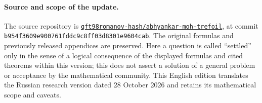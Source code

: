 \documentclass[11pt,a4paper]{article}
\theoremstyle{definition}
\theoremstyle{remark}
\begin{document}
\paragraph{Source and scope of the update.}
The source repository is
\href{https://github.com/qft98romanov-hash/abhyankar-moh-trefoil/tree/b954f3609e900761fddc9c8ff03d8301e9604cab}{\nolinkurl{qft98romanov-hash/abhyankar-moh-trefoil}},
at commit \nolinkurl{b954f3609e900761fddc9c8ff03d8301e9604cab}.
The original formulas and previously released appendices are preserved.
Here a question is called ``settled'' only in the sense of a logical
consequence of the displayed formulas and cited theorems within this version;
this does not assert a solution of a general problem or acceptance by the
mathematical community. This English edition translates the Russian research
version dated 28 October 2026 and retains its mathematical scope and caveats.

\clearpage
\tableofcontents
\clearpage






\end{document}
